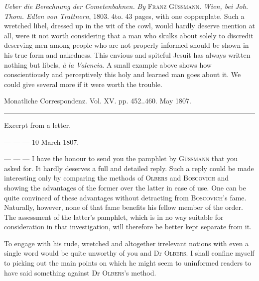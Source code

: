 \expandafter\def\csname HistoricalNoteText491\endcsname{\emph{Ueber die Berechnung der Cometenbahnen.} \emph{By} \textsc{Franz Güssmann}. \emph{Wien, bei Joh. Thom. Edlen von Trattnern}, 1803. 4to. 43 pages, with one copperplate. Such a wretched libel, dressed up in the wit of the cowl, would hardly deserve mention at all, were it not worth considering that a man who skulks about solely to discredit deserving men among people who are not properly informed should be shown in his true form and nakedness. This envious and spiteful Jesuit has always written nothing but libels, \emph{à la Valencia}. A small example above shows how conscientiously and perceptively this holy and learned man goes about it. We could give several more if it were worth the trouble.}
\clearpage
{}
\hypertarget{native-491-lower}{}\label{native-491-lower}
\begin{center}
\small Monatliche Correspondenz. Vol. XV. pp. 452..460. May 1807.\\[3pt]
\rule{.72\linewidth}{.3pt}
\end{center}
\begin{center}Excerpt from a letter.\end{center}
\begin{flushright}--- --- --- 10 March 1807.\end{flushright}

--- --- --- I have the honour to send you the pamphlet by \textsc{Güssmann} that you asked for.%
%
\space It hardly deserves a full and detailed reply. Such a reply could be made interesting only by comparing the methods of \textsc{Olbers} and \textsc{Boscovich} and showing the advantages of the former over the latter in ease of use. One can be quite convinced of these advantages without detracting from \textsc{Boscovich}’s fame. Naturally, however, none of that fame benefits his fellow member of the order. The assessment of the latter’s pamphlet, which is in no way suitable for consideration in that investigation, will therefore be better kept separate from it.

To engage with his rude, wretched and altogether irrelevant notions with even a single word would be quite unworthy of you and Dr \textsc{Olbers}. I shall confine myself to picking out the main points on which he might seem to uninformed readers to have said something against Dr \textsc{Olbers}’s method.

